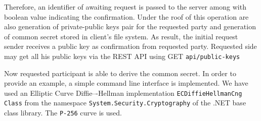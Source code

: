 

Therefore, an identifier of awaiting request is passed to the server among with boolean value
indicating the confirmation.
Under the roof of this operation are also generation of private-public keys pair for the requested party and
generation of common secret stored in client's file system.
As result, the initial request sender receives a public key as confirmation from requested party.
Requested side may get all his public keys via the REST API using GET \texttt{api/public-keys}



Now requested participant is able to derive the common secret.
In order to provide an example, a simple command line interface is implemented.
We have used an Elliptic Curve Diffie–-Hellman implementation \texttt{ECDiffieHellmanCng Class} from the namespace
\texttt{System.Security.Cryptography} of the .NET base class library.
The \texttt{P-256} curve is used.

